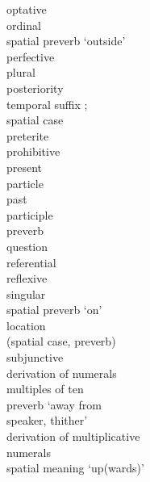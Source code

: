 \begin{multicols}{2}
\begin{tabbing}
				\>	{optative}\\
				\>	ordinal\\
				\>	spatial {preverb} `outside'\\
				\>	perfective\\
				\>	plural\\
				\>	posteriority \\
			{}		\>	    temporal suffix ;\\
			{}		\>	    {spatial case}  \\
				\>	preterite\\
				\>	{prohibitive}\\
				\>	present\\
				\>	{particle}\\
				\>	past\\
				\>	{participle}\\
				\>	{preverb}\\
					\>	question\\
				\>	referential\\
				\>	reflexive\\
				\>	singular\\
				\>	spatial {preverb} `on'\\
				\>	location \\
			{}		\>	({spatial case}, {preverb})\\
				\>	{subjunctive}\\
				\>	{derivation} of numerals \\ \> multiples of ten\\
				\>	{preverb} `away from \\ \> speaker, thither'\\
				\>	{derivation} of multiplicative \\ \> numerals\\
				\>	spatial meaning `up(wards)'\\
		\end{tabbing}
	\end{multicols}

